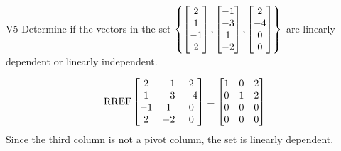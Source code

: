 \begin{problem}{V5}
Determine if the vectors in the set \(\left\{ \begin{bmatrix} 2 \\ 1 \\ -1 \\ 2 \end{bmatrix}, \begin{bmatrix} -1 \\ -3 \\ 1 \\ -2 \end{bmatrix}, \begin{bmatrix} 2 \\ -4 \\ 0 \\ 0 \end{bmatrix} \right\} \) are linearly dependent or linearly independent.
\end{problem}
\begin{solution}
\[ \operatorname{RREF} \begin{bmatrix} 2 & -1 & 2 \\ 1 & -3 & -4 \\ -1 & 1 & 0 \\ 2 & -2 & 0 \end{bmatrix} = \begin{bmatrix} 1 & 0 & 2 \\ 0 & 1 & 2 \\ 0 & 0 & 0 \\ 0 & 0 & 0 \end{bmatrix} \]
Since the third column is not a pivot column, the set is linearly dependent.
\end{solution}

